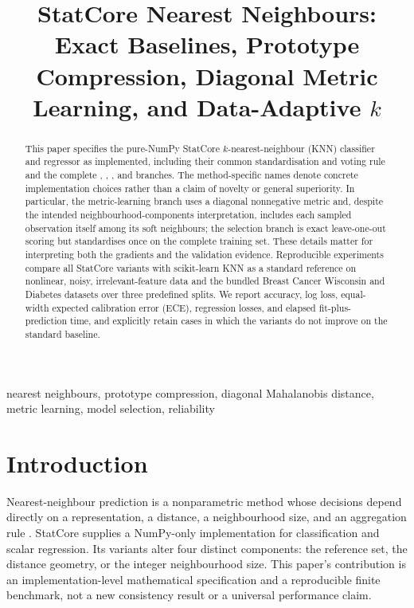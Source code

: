 \documentclass[conference]{IEEEtran}
\title{StatCore Nearest Neighbours: Exact Baselines, Prototype Compression, Diagonal Metric Learning, and Data-Adaptive $k$}
\author{\jabulaniauthor \and \martinchanzauthor \and \oloratoauthor \and \mfundoauthor}
\begin{document}
\maketitle

\begin{abstract}
This paper specifies the pure-NumPy StatCore $k$-nearest-neighbour (KNN) classifier and regressor as implemented, including their common standardisation and voting rule and the complete , , , and  branches. The method-specific names denote concrete implementation choices rather than a claim of novelty or general superiority. In particular, the metric-learning branch uses a diagonal nonnegative metric and, despite the intended neighbourhood-components interpretation, includes each sampled observation itself among its soft neighbours; the selection branch is exact leave-one-out scoring but standardises once on the complete training set. These details matter for interpreting both the gradients and the validation evidence. Reproducible experiments compare all StatCore variants with scikit-learn KNN as a standard reference on nonlinear, noisy, irrelevant-feature data and the bundled Breast Cancer Wisconsin and Diabetes datasets over three predefined splits. We report accuracy, log loss, equal-width expected calibration error (ECE), regression losses, and elapsed fit-plus-prediction time, and explicitly retain cases in which the variants do not improve on the standard baseline.
\end{abstract}

\begin{IEEEkeywords}
nearest neighbours, prototype compression, diagonal Mahalanobis distance, metric learning, model selection, reliability
\end{IEEEkeywords}

\section{Introduction}
Nearest-neighbour prediction is a nonparametric method whose decisions depend directly on a representation, a distance, a neighbourhood size, and an aggregation rule \cite{cover1967,fix1951}. StatCore supplies a NumPy-only implementation for classification and scalar regression. Its variants alter four distinct components: the reference set, the distance geometry, or the integer neighbourhood size. This paper's contribution is an implementation-level mathematical specification and a reproducible finite benchmark, not a new consistency result or a universal performance claim.
\end{document}

